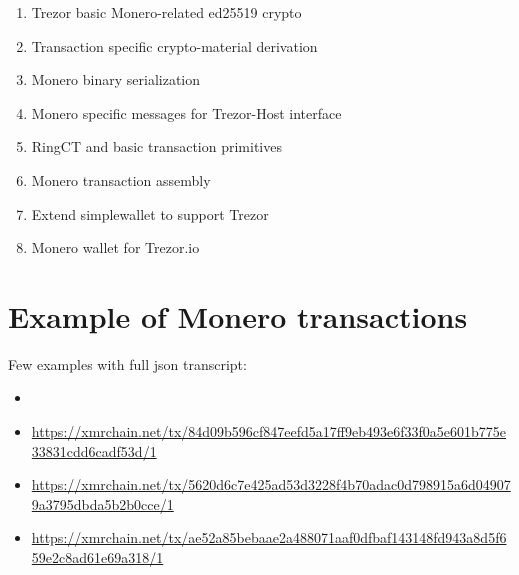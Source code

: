 \documentclass[]{article}
\begin{document}
\begin{enumerate}
	\item Trezor basic Monero-related ed25519 crypto
	\item Transaction specific crypto-material derivation
	\item Monero binary serialization
	\item Monero specific messages for Trezor-Host interface
	\item RingCT and basic transaction primitives
	\item Monero transaction assembly
	\item Extend simplewallet to support Trezor
	\item Monero wallet for Trezor.io 
\end{enumerate}


%



\appendix
\section{Example of Monero transactions}



Few examples with full json transcript:
\begin{itemize}
	\item \footnotesize{}
	
	\item \footnotesize\url{https://xmrchain.net/tx/84d09b596cf847eefd5a17ff9eb493e6f33f0a5e601b775e33831cdd6cadf53d/1}
	
	\item \footnotesize\url{https://xmrchain.net/tx/5620d6c7e425ad53d3228f4b70adac0d798915a6d049079a3795dbda5b2b0cce/1}
	
	\item \footnotesize\url{https://xmrchain.net/tx/ae52a85bebaae2a488071aaf0dfbaf143148fd943a8d5f659e2c8ad61e69a318/1}
\end{itemize}

{}

	
\end{document}
